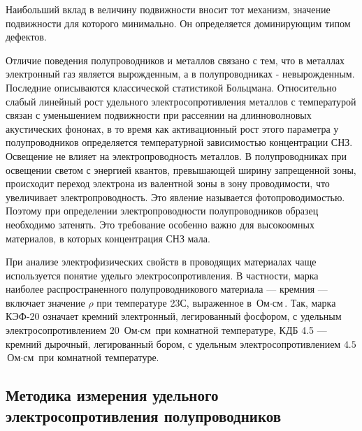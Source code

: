 Наибольший вклад в величину подвижности вносит тот механизм, значение подвижности для которого минимально. Он определяется доминирующим типом дефектов.

Отличие поведения полупроводников и металлов связано с тем, что в металлах электронный газ является вырожденным, а в полупроводниках - невырожденным. Последние описываются классической статистикой Больцмана. Относительно слабый линейный рост удельного электросопротивления металлов с температурой связан с уменьшением подвижности при рассеянии на длинноволновых акустических фононах, в то время как активационный рост этого параметра у полупроводников определяется температурной зависимостью концентрации СНЗ. Освещение не влияет на электропроводность металлов. В полупроводниках при освещении светом с энергией квантов, превышающей ширину запрещенной зоны, происходит переход электрона из валентной зоны в зону проводимости, что увеличивает электропроводность. Это явление называется фотопроводимостью. Поэтому при определении электропроводности полупроводников образец необходимо затенять. Это требование особенно важно для высокоомных материалов, в которых концентрация СНЗ мала.

При анализе электрофизических свойств в проводящих материалах чаще используется понятие удельго электросопротивления. В частности, марка наиболее распространенного полупроводникового материала — кремния — включает значение $\rho$ при температуре 23\textdegree С, выраженное в $\text{Ом}\cdot\text{см}$. Так, марка КЭФ-20 означает кремний электронный, легированный фосфором, с удельным электросопротивлением $20$ $\text{Ом}\cdot\text{см}$ при комнатной температуре, КДБ 4.5 — кремний дырочный, легированный бором, с удельным электросопротивлением $4.5$ $\text{Ом}\cdot\text{см}$ при комнатной температуре.

\subsection{Методика измерения удельного электросопротивления полупроводников}

